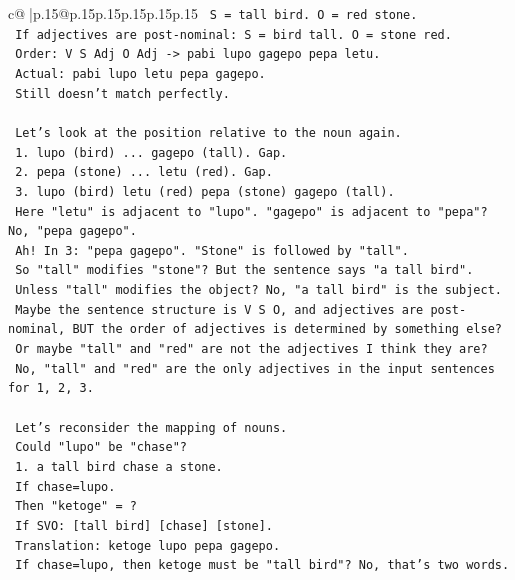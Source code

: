 \documentclass{article}
\begin{document}
{\begin{supertabular}{c@{$\;$}|p{.15\linewidth}@{}p{.15\linewidth}p{.15\linewidth}p{.15\linewidth}p{.15\linewidth}p{.15\linewidth}}
{{{\texttt{      S = tall bird. O = red stone.} \\
\texttt{      If adjectives are post{-}nominal: S = bird tall. O = stone red.} \\
\texttt{      Order: V S Adj O Adj {-}> pabi lupo gagepo pepa letu.} \\
\texttt{      Actual: pabi lupo letu pepa gagepo.} \\
\texttt{      Still doesn't match perfectly.} \\
\\ 
\texttt{   Let's look at the position relative to the noun again.} \\
\texttt{   1. lupo (bird) ... gagepo (tall). Gap.} \\
\texttt{   2. pepa (stone) ... letu (red). Gap.} \\
\texttt{   3. lupo (bird) letu (red) pepa (stone) gagepo (tall).} \\
\texttt{      Here "letu" is adjacent to "lupo". "gagepo" is adjacent to "pepa"? No, "pepa gagepo".} \\
\texttt{      Ah! In 3: "pepa gagepo". "Stone" is followed by "tall".} \\
\texttt{      So "tall" modifies "stone"? But the sentence says "a tall bird".} \\
\texttt{      Unless "tall" modifies the object? No, "a tall bird" is the subject.} \\
\texttt{      Maybe the sentence structure is V S O, and adjectives are post{-}nominal, BUT the order of adjectives is determined by something else?} \\
\texttt{      Or maybe "tall" and "red" are not the adjectives I think they are?} \\
\texttt{      No, "tall" and "red" are the only adjectives in the input sentences for 1, 2, 3.} \\
\\ 
\texttt{   Let's reconsider the mapping of nouns.} \\
\texttt{   Could "lupo" be "chase"?} \\
\texttt{   1. a tall bird chase a stone.} \\
\texttt{      If chase=lupo.} \\
\texttt{      Then "ketoge" = ?} \\
\texttt{      If SVO: {[}tall bird{]} {[}chase{]} {[}stone{]}.} \\
\texttt{      Translation: ketoge lupo pepa gagepo.} \\
\texttt{      If chase=lupo, then ketoge must be "tall bird"? No, that's two words.} \\
}}}
\end{supertabular}}
\end{document}
